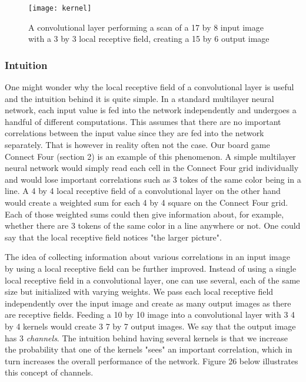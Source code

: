\documentclass[titlepage]{article}
\begin{document}
\vskip 0.3cm

\begin{figure}[h]
    \center
    \texttt{[image: kernel]}
    \vskip 0.2cm
    \caption{A convolutional layer performing a scan of a 17 by 8 input image with a 3 by 3 local receptive field, creating a 15 by 6 output image}
\end{figure}

\newpage

\subsubsection{Intuition}

\vskip 0.2cm

One might wonder why the local receptive field of a convolutional layer is useful and the intuition behind it is quite simple. In a standard multilayer neural network, each input value is fed into the network independently and undergoes a handful of different computations. This assumes that there are no important correlations between the input value since they are fed into the network separately. That is however in reality often not the case. Our board game Connect Four (section 2) is an example of this phenomenon. A simple multilayer neural network would simply read each cell in the Connect Four grid individually and would lose important correlations such as 3 tokes of the same color being in a line. A 4 by 4 local receptive field of a convolutional layer on the other hand would create a weighted sum for each 4 by 4 square on the Connect Four grid. Each of those weighted sums could then give information about, for example, whether there are 3 tokens of the same color in a line anywhere or not. One could say that the local receptive field notices "the larger picture". 

\vskip 0.2cm

\noindent
The idea of collecting information about various correlations in an input image by using a local receptive field can be further improved. Instead of using a single local receptive field in a convolutional layer, one can use several, each of the same size but initialized with varying weights. We pass each local receptive field independently over the input image and create as many output images as there are receptive fields. Feeding a 10 by 10 image into a convolutional layer with 3 4 by 4 kernels would create 3 7 by 7 output images. We say that the output image has 3 \emph{channels}. The intuition behind having several kernels is that we increase the probability that one of the kernels "sees" an important correlation, which in turn increases the overall performance of the network. Figure 26 below illustrates this concept of channels.
\end{document}
